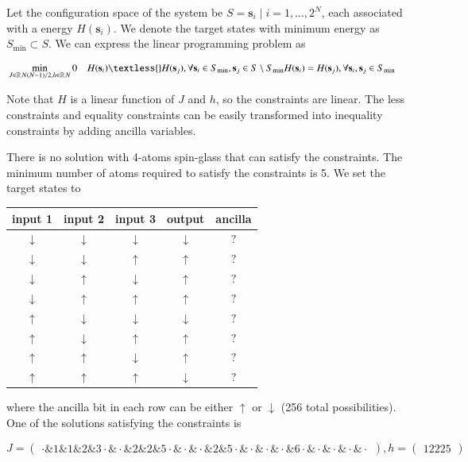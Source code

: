 \documentclass[twocolumn,superscriptaddress,english,showpacs,longbibliography]{revtex4-2}
\begin{document}
Let the configuration space of the system be
$S = {\mathbf s_i\mid i=1,\ldots, 2^N}$, each associated with a
energy $H(\mathbf s_i)$. We denote the target states with minimum
energy as $S_{\text{min}} \subset S$. We can express the linear
programming problem as

\begin{align*}
&\min_{J \in \mathbb{R}^{}{N(N{-}1)/2}, h\in \mathbb{R}^{}N} 0
&H(\mathbf s_i) \textless{} H(\mathbf s_j), \forall \mathbf s_i \in S_{\text{min}}, \mathbf s_j \in S \setminus S_{\text{min}}
&H(\mathbf s_i) = H(\mathbf s_j), \forall \mathbf s_i, \mathbf s_j \in S_{\text{min}}
\end{align*}

Note that $H$ is a linear function of $J$ and $h$, so the
constraints are linear. The less constraints and equality constraints
can be easily transformed into inequality constraints by adding ancilla
variables.

There is no solution with 4-atoms spin-glass that can satisfy the
constraints. The minimum number of atoms required to satisfy the
constraints is 5. We set the target states to

\begin{tabular}{|c|c|c|c|c|}
\hline
input 1 & input 2 & input 3 & output & ancilla \\
\hline
$\downarrow$ & $\downarrow$ & $\downarrow$ & $\downarrow$ & $?$ \\
$\downarrow$ & $\downarrow$ & $\uparrow$ & $\uparrow$ & $?$ \\
$\downarrow$ & $\uparrow$ & $\downarrow$ & $\uparrow$ & $?$ \\
$\downarrow$ & $\uparrow$ & $\uparrow$ & $\uparrow$ & $?$ \\
$\uparrow$ & $\downarrow$ & $\downarrow$ & $\downarrow$ & $?$ \\
$\uparrow$ & $\downarrow$ & $\uparrow$ & $\uparrow$ & $?$ \\
$\uparrow$ & $\uparrow$ & $\downarrow$ & $\uparrow$ & $?$ \\
$\uparrow$ & $\uparrow$ & $\uparrow$ & $\downarrow$ & $?$ \\
\hline
\end{tabular}

where the ancilla bit in each row can be either $\uparrow$ or
$\downarrow$ (256 total possibilities). One of the solutions
satisfying the constraints is

\begin{equation}
J = \begin{pmatrix}
\cdot \& 1 \& 1 \& 2 \& 3
\cdot \& \cdot \& 2 \& 2 \& 5
\cdot \& \cdot \& \cdot \& 2 \& 5
\cdot \& \cdot \& \cdot \& \cdot \& 6
\cdot \& \cdot \& \cdot \& \cdot \& \cdot
\end{pmatrix}, h = \begin{pmatrix}
1
2
2
2
5
\end{pmatrix}
\end{equation}
\end{document}
